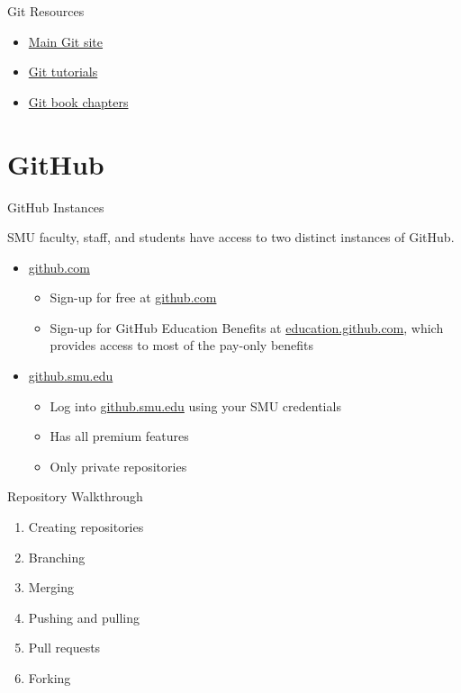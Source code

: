 \documentclass[aspectratio=169]{beamer}
\begin{document}
\begin{frame}{Git Resources}

\begin{itemize}
\item
  \href{http://git-scm.com/}{Main Git site}
\item
  \href{http://www.atlassian.com/git/tutorial}{Git tutorials}
\item
  \href{http://git-scm.com/book}{Git book chapters}
\end{itemize}

\end{frame}

\section{GitHub}

\begin{frame}{GitHub Instances}

SMU faculty, staff, and students have access to two distinct instances
of GitHub.

\begin{itemize}
\item
  \href{https://www.github.com}{github.com}

  \begin{itemize}
    \item
    Sign-up for free at \href{https://www.github.com}{github.com}
  \item
    Sign-up for GitHub Education Benefits at
    \href{https://education.github.com}{education.github.com}, which
    provides access to most of the pay-only benefits
    \end{itemize}
\item
    \href{https://github.smu.edu}{github.smu.edu}
    \begin{itemize}
  \item
    Log into \href{https://github.smu.edu}{github.smu.edu} using your
    SMU credentials
  \item
    Has all premium features
  \item
    Only private repositories
  \end{itemize}
\end{itemize}

\end{frame}

\begin{frame}{Repository Walkthrough}

\begin{enumerate}
\item
  Creating repositories
\item
  Branching
\item
  Merging
\item
  Pushing and pulling
\item
  Pull requests
\item
  Forking
\end{enumerate}

\end{frame}
\end{document}
